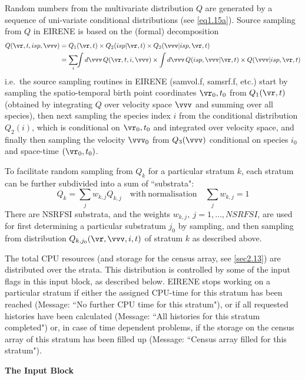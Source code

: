 Random numbers from the multivariate distribution $Q$ are generated by a
sequence of uni-variate conditional distributions (see \cref{eq1.15a}).
Source sampling from $Q$ in EIRENE is based on the (formal) decomposition
\begin{align}
  \label{samp-Q} Q(\vr,t,isp,\vvv) & = Q_1(\vr,t) \times
  Q_2(isp|\vr,t) \times Q_3(\vvv|isp,\vr,t) \nonumber                       \\
                                  & = \sum_i\!\!\int d\vvv \,Q(\vr,t,i,\vvv)
  \times \int d\vvv \,Q(isp,\vvv|\vr,t)
  \times Q(\vvv |isp,\vr,t)
\end{align}
i.e.\ the source sampling routines in EIRENE
(samvol.f, samsrf.f, etc.)
start by sampling the spatio-temporal birth point
coordinates $\vr_0,t_0$
from $Q_1(\vr,t)$ (obtained by integrating $Q$ over velocity space $\vvv$ and
summing over all species), then next sampling the species index $i$
from the conditional distribution $Q_2(i) $, which is conditional on
$\vr_0,t_0$ and integrated over velocity space,
and finally then sampling the velocity $\vvv_0$ from $Q_3(\vvv)$ conditional on
species $i_0$ and space-time $(\vr_0,t_0)$.

To facilitate random sampling from $Q_k$ for a particular stratum $k$, each
stratum can be further subdivided into a sum of ``substrata":
\begin{equation}
  Q_k= \sum_j w_{k,j} Q_{k,j}  \quad \mathrm{with\ normalisation} \quad \sum_j
  w_{k,j} = 1
\end{equation}
There are NSRFSI substrata, and the weights
$w_{k,j}, \ j = 1, \dots, NSRFSI$, are used for first determining a particular
substratum $j_0$ by sampling, and then sampling from distribution
$Q_{k,j_0}(\vr,\vvv,i,t)$ of stratum $k$ as described above.

The total CPU resources (and storage for the census array, see \cref{sec2.13})
are distributed over the strata.
This distribution is controlled by some of the input flags in this input block,
as described below.
EIRENE stops working on a particular stratum if either the assigned CPU-time
for this stratum has been reached (Message: ``No further CPU time for this
stratum"), or if all requested histories have been calculated (Message: ``All
histories for this stratum completed") or, in case of time dependent problems,
if the storage on the census array of this stratum has been filled up (Message:
``Census array filled for this stratum").

\medskip

\textbf{The Input Block} 

